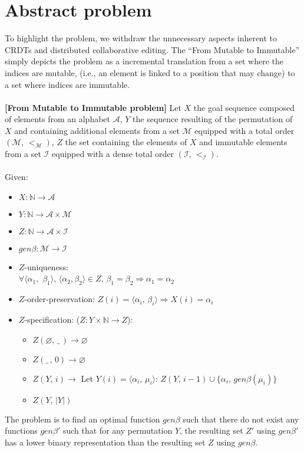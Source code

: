 \section{Abstract problem}
\label{sec:problem}
To highlight the problem, we withdraw the unnecessary aspects inherent to CRDTs
and distributed collaborative editing. The ``From Mutable to Immutable'' simply
depicts the problem as a incremental translation from a set where the indices
are mutable, (i.e., an element is linked to a position that may change) to a
set where indices are immutable.
\ \\ \ \\
\textbf{[From Mutable to Immutable problem]} Let $X$ the goal sequence composed
of elements from an alphabet $\mathcal{A}$, $Y$ the sequence resulting of the
permutation of $X$ and containing additional elements from a set $\mathcal{M}$
equipped with a total order $(\mathcal{M},\, <_\mathcal{M})$, $Z$ the set
containing the elements of $X$ and immutable elements from a set $\mathcal{I}$
equipped with a dense total order $(\mathcal{I},\,
<_\mathcal{I})$.\\ \ \\ Given:
\vspace{-\topsep}
\begin{itemize} \itemsep0em
\item $X: \mathbb{N} \rightarrow \mathcal{A}$
\item $Y: \mathbb{N} \rightarrow \mathcal{A} \times \mathcal{M}$
\item $Z: \mathbb{N} \rightarrow \mathcal{A} \times \mathcal{I}$
\item $gen\beta:\mathcal{M} \rightarrow \mathcal{I}$
\item $Z$-uniqueness:\\ $\forall\langle \alpha_1,$ $\beta_1
  \rangle$, $\langle \alpha_2,\beta_2 \rangle \in Z$, $\beta_1
  = \beta_2 \Rightarrow \alpha_1 = \alpha_2$
\item $Z$-order-preservation: $Z(i) = \langle \alpha_i,\, \beta_i\rangle
  \Rightarrow X(i) = \alpha_i$
\item $Z$-specification: ($Z:Y\times\mathbb{N}\rightarrow Z$):
  \vspace{-\topsep}
  \begin{itemize} \itemsep0em
  \item $Z(\varnothing,\,\_\,) \rightarrow \varnothing$
  \item $Z(\_\,,\, 0) \rightarrow \varnothing$
  \item $Z(Y,\, i) \rightarrow$ Let $Y(i) = \langle \alpha_i,\,\mu_i \rangle$:
    $Z(Y,\, i-1) \cup \{\alpha_i,\, gen\beta(\mu_i) \}$
  \item $Z(Y,\,|Y|)$
  \end{itemize}
\end{itemize}
The problem is to find an optimal function $gen\beta$ such that there do not
exist any functions $gen\beta'$ such that for any permutation $Y$, the
resulting set $Z'$ using $gen\beta'$ has a lower binary representation than the
resulting set $Z$ using $gen\beta$.
\ \\


